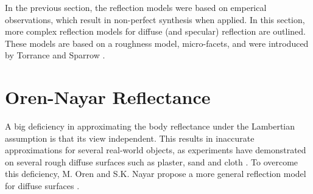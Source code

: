 \hypertarget{Physical Models}{
}


\noindent In the previous section, the reflection models were based on emperical observations, which result in non-perfect synthesis when applied. In this section, more complex reflection models for diffuse (and specular) reflection are outlined. These models are based on a roughness model, micro-facets, and were introduced by Torrance and Sparrow \cite{TorranceSparrow}.

\section{Oren-Nayar Reflectance}\label{OrenNayar}
A big deficiency in approximating the body reflectance under the Lambertian assumption is that its view independent. This results in inaccurate approximations for several real-world objects, as experiments have demonstrated on several rough diffuse surfaces such as plaster, sand and cloth \cite{OrenNayar}. To overcome this deficiency, M. Oren and S.K. Nayar propose a more general reflection model for diffuse surfaces \cite{OrenNayar}.
